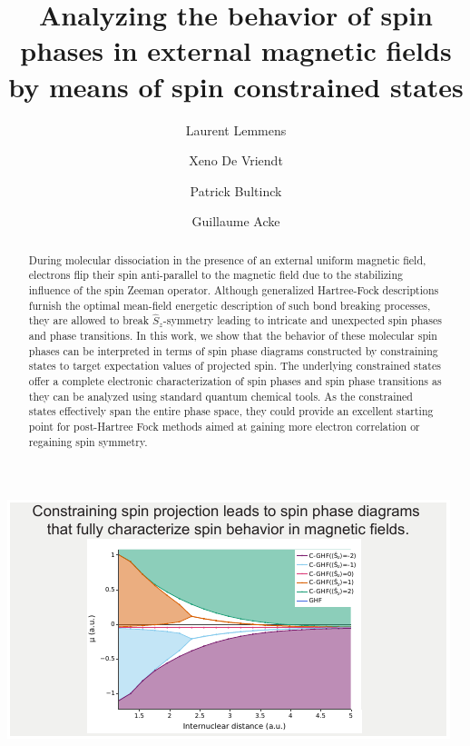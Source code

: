 \documentclass[journal=jctc,manuscript=article]{achemso}
\author{Laurent Lemmens}
\author{Xeno De Vriendt}
\author{Patrick Bultinck}
\author{Guillaume Acke}
\affiliation{Ghent University, Department of Chemistry - Ghent Quantum Chemistry Group, Krijgslaan 281 (S3), B-9000 Ghent, Belgium}
\title{Analyzing the behavior of spin phases in external magnetic fields by means of spin constrained states}
\begin{document}
\begin{tocentry}

\includegraphics{graphical-TOC}

\end{tocentry}

\begin{abstract}
    During molecular dissociation in the presence of an external uniform magnetic field, electrons flip their spin anti-parallel to the magnetic field due to the stabilizing influence of the spin Zeeman operator.
    Although generalized Hartree-Fock descriptions furnish the optimal mean-field energetic description of such bond breaking processes, they are allowed to break $\hat{S}_z$-symmetry leading to intricate and unexpected spin phases and phase transitions.
    In this work, we show that the behavior of these molecular spin phases can be interpreted in terms of spin phase diagrams constructed by constraining states to target expectation values of projected spin.
    The underlying constrained states offer a complete electronic characterization of spin phases and spin phase transitions as they can be analyzed using standard quantum chemical tools.
    As the constrained states effectively span the entire phase space, they could provide an excellent starting point for post-Hartree Fock methods aimed at gaining more electron correlation or regaining spin symmetry.
\end{abstract}
\end{document}
